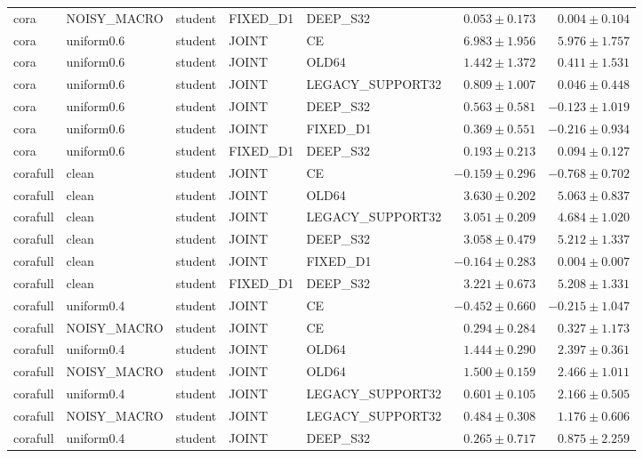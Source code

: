 \begin{longtable}{lllllrr}
cora & NOISY\_MACRO & student & FIXED\_D1 & DEEP\_S32 & $0.053 \pm 0.173$ & $0.004 \pm 0.104$ \\
cora & uniform0.6 & student & JOINT & CE & $6.983 \pm 1.956$ & $5.976 \pm 1.757$ \\
cora & uniform0.6 & student & JOINT & OLD64 & $1.442 \pm 1.372$ & $0.411 \pm 1.531$ \\
cora & uniform0.6 & student & JOINT & LEGACY\_SUPPORT32 & $0.809 \pm 1.007$ & $0.046 \pm 0.448$ \\
cora & uniform0.6 & student & JOINT & DEEP\_S32 & $0.563 \pm 0.581$ & $-0.123 \pm 1.019$ \\
cora & uniform0.6 & student & JOINT & FIXED\_D1 & $0.369 \pm 0.551$ & $-0.216 \pm 0.934$ \\
cora & uniform0.6 & student & FIXED\_D1 & DEEP\_S32 & $0.193 \pm 0.213$ & $0.094 \pm 0.127$ \\
corafull & clean & student & JOINT & CE & $-0.159 \pm 0.296$ & $-0.768 \pm 0.702$ \\
corafull & clean & student & JOINT & OLD64 & $3.630 \pm 0.202$ & $5.063 \pm 0.837$ \\
corafull & clean & student & JOINT & LEGACY\_SUPPORT32 & $3.051 \pm 0.209$ & $4.684 \pm 1.020$ \\
corafull & clean & student & JOINT & DEEP\_S32 & $3.058 \pm 0.479$ & $5.212 \pm 1.337$ \\
corafull & clean & student & JOINT & FIXED\_D1 & $-0.164 \pm 0.283$ & $0.004 \pm 0.007$ \\
corafull & clean & student & FIXED\_D1 & DEEP\_S32 & $3.221 \pm 0.673$ & $5.208 \pm 1.331$ \\
corafull & uniform0.4 & student & JOINT & CE & $-0.452 \pm 0.660$ & $-0.215 \pm 1.047$ \\
corafull & NOISY\_MACRO & student & JOINT & CE & $0.294 \pm 0.284$ & $0.327 \pm 1.173$ \\
corafull & uniform0.4 & student & JOINT & OLD64 & $1.444 \pm 0.290$ & $2.397 \pm 0.361$ \\
corafull & NOISY\_MACRO & student & JOINT & OLD64 & $1.500 \pm 0.159$ & $2.466 \pm 1.011$ \\
corafull & uniform0.4 & student & JOINT & LEGACY\_SUPPORT32 & $0.601 \pm 0.105$ & $2.166 \pm 0.505$ \\
corafull & NOISY\_MACRO & student & JOINT & LEGACY\_SUPPORT32 & $0.484 \pm 0.308$ & $1.176 \pm 0.606$ \\
corafull & uniform0.4 & student & JOINT & DEEP\_S32 & $0.265 \pm 0.717$ & $0.875 \pm 2.259$ \\

\end{longtable}
